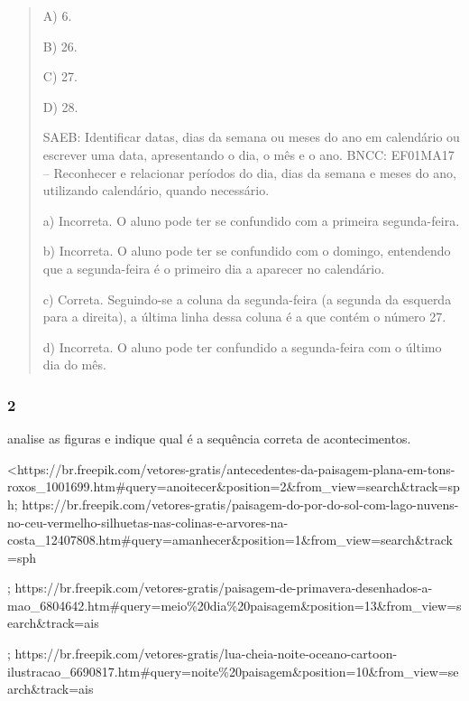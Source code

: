 \begin{quote}
A) 6.

B) 26.

C) 27.

D) 28.

SAEB: Identificar datas, dias da semana ou meses do ano em
calendário ou escrever uma data, apresentando o dia, o mês e o ano.
BNCC: EF01MA17 -- Reconhecer e relacionar períodos do dia, dias da semana
e meses do ano, utilizando calendário, quando necessário.

a) Incorreta. O aluno pode ter se confundido com a primeira segunda-feira.

b) Incorreta. O aluno pode ter se confundido com o domingo, entendendo que
a segunda-feira é o primeiro dia a aparecer no calendário.

c) Correta. Seguindo-se a coluna da segunda-feira (a segunda da esquerda para a direita), a última linha dessa coluna é a que contém o número 27.

d) Incorreta. O aluno pode ter confundido a segunda-feira com o último
dia do mês.
\end{quote}

\subsubsection{2}\label{section-52}

analise as figuras e indique qual é a sequência correta de
acontecimentos.

\textless{}https://br.freepik.com/vetores-gratis/antecedentes-da-paisagem-plana-em-tons-roxos\_1001699.htm\#query=anoitecer\&position=2\&from\_view=search\&track=sph;
https://br.freepik.com/vetores-gratis/paisagem-do-por-do-sol-com-lago-nuvens-no-ceu-vermelho-silhuetas-nas-colinas-e-arvores-na-costa\_12407808.htm\#query=amanhecer\&position=1\&from\_view=search\&track=sph

;
https://br.freepik.com/vetores-gratis/paisagem-de-primavera-desenhados-a-mao\_6804642.htm\#query=meio\%20dia\%20paisagem\&position=13\&from\_view=search\&track=ais

;
https://br.freepik.com/vetores-gratis/lua-cheia-noite-oceano-cartoon-ilustracao\_6690817.htm\#query=noite\%20paisagem\&position=10\&from\_view=search\&track=ais

